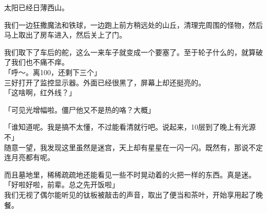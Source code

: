 太阳已经日薄西山。

我们一边狂撒魔法和铁球，一边跑上前方稍远处的山丘，清理完周围的怪物，然后马上取出了房车进入，然后关上了门。

我们取下了车后的舵，这么一来车子就变成一个要塞了。至于轮子什么的，就算破了我们也不痛不痒。\\

「呼～。离100，还剩下三个」\\

三好打开了监控显示器。外面已经很黑了，屏幕上却还挺亮的。\\

「这啥啊，红外线？」

「可见光增幅啦。僵尸他又不是热的咯？大概」

「谁知道呢。我是搞不太懂，不过能看清就行吧。说起来，10层到了晚上有光源不」\\

随意一望，我发现这里虽然是迷宫，天上却有星星在一闪一闪。既然有，那说不定连月亮都有呢。

而且墓地里，稀稀疏疏地还能看见一些不时晃动着的火把一样的东西。真是迷。\\

「好啦好啦，前辈。总之先开饭啦」\\

我们无视了偶尔能听见的钛板被敲击的声音，取出了便当和茶叶，开始享用起了晚餐。

